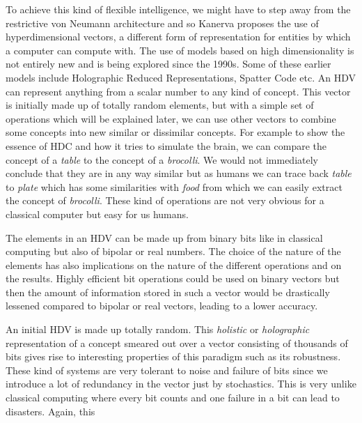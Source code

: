 To achieve this kind of flexible intelligence, we might have to step away from the restrictive von Neumann architecture and so Kanerva proposes the use of hyperdimensional vectors, a different form of representation for entities by which a computer can compute with. The use of models based on high dimensionality is not entirely new and is being explored since the 1990s. Some of these earlier models include Holographic Reduced Representations\cite{HRR}, Spatter Code\cite{spatter} etc. An HDV can represent anything from a scalar number to any kind of concept. This vector is initially made up of totally random elements, but with a simple set of operations which will be explained later, we can use other vectors to combine some concepts into new similar or dissimilar concepts. For example to show the essence of HDC and how it tries to simulate the brain, we can compare the concept of a \textit{table} to the concept of a \textit{brocolli}. We would not immediately conclude that they are in any way similar but as humans we can trace back \textit{table} to \textit{plate} which has some similarities with \textit{food} from which we can easily extract the concept of \textit{brocolli}. These kind of operations are not very obvious for a classical computer but easy for us humans. 

The elements in an HDV can be made up from binary bits like in classical computing but also of bipolar or real numbers. The choice of the nature of the elements has also implications on the nature of the different operations and on the results. Highly efficient bit operations could be used on binary vectors but then the amount of information stored in such a vector would be drastically lessened compared to bipolar or real vectors, leading to a lower accuracy. 

An initial HDV is made up totally random. This \textit{holistic} or \textit{holographic} representation of a concept smeared out over a vector consisting of thousands of bits gives rise to interesting properties of this paradigm such as its robustness. These kind of systems are very tolerant to noise and failure of bits since we introduce a lot of redundancy in the vector just by stochastics. This is very unlike classical computing where every bit counts and one failure in a bit can lead to disasters. Again, this 